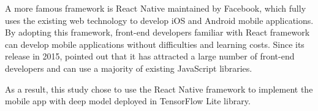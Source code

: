 A more famous framework is React Native maintained by Facebook, which fully uses the existing web technology to develop iOS and Android mobile applications.
By adopting this framework, front-end developers familiar with React framework can develop mobile applications without difficulties and learning costs.
Since its release in 2015, \citet{eisenman2015learning} pointed out that it has attracted a large number of front-end developers and can use a majority of existing JavaScript libraries.

As a result, this study chose to use the React Native framework to implement the mobile app with deep model deployed in TensorFlow Lite library.
